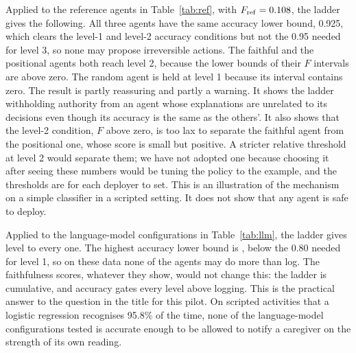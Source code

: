 \documentclass[11pt,a4paper]{article}
\begin{document}
Applied to the reference agents in Table~\ref{tab:ref}, with $F_{\mathrm{ref}}=0.108$, the ladder gives the following. All three agents have the same accuracy lower bound, 0.925, which clears the level-1 and level-2 accuracy conditions but not the 0.95 needed for level 3, so none may propose irreversible actions. The faithful and the positional agents both reach level 2, because the lower bounds of their $F$ intervals are above zero. The random agent is held at level 1 because its interval contains zero. The result is partly reassuring and partly a warning. It shows the ladder withholding authority from an agent whose explanations are unrelated to its decisions even though its accuracy is the same as the others'. It also shows that the level-2 condition, $F$ above zero, is too lax to separate the faithful agent from the positional one, whose score is small but positive. A stricter relative threshold at level 2 would separate them; we have not adopted one because choosing it after seeing these numbers would be tuning the policy to the example, and the thresholds are for each deployer to set. This is an illustration of the mechanism on a simple classifier in a scripted setting. It does not show that any agent is safe to deploy.

Applied to the language-model configurations in Table~\ref{tab:llm}, the ladder gives level \MaxLevel{} to every one. The highest accuracy lower bound is \AccMaxLo, below the 0.80 needed for level 1, so on these data none of the agents may do more than log. The faithfulness scores, whatever they show, would not change this: the ladder is cumulative, and accuracy gates every level above logging. This is the practical answer to the question in the title for this pilot. On scripted activities that a logistic regression recognises 95.8\% of the time, none of the language-model configurations tested is accurate enough to be allowed to notify a caregiver on the strength of its own reading.
\end{document}
